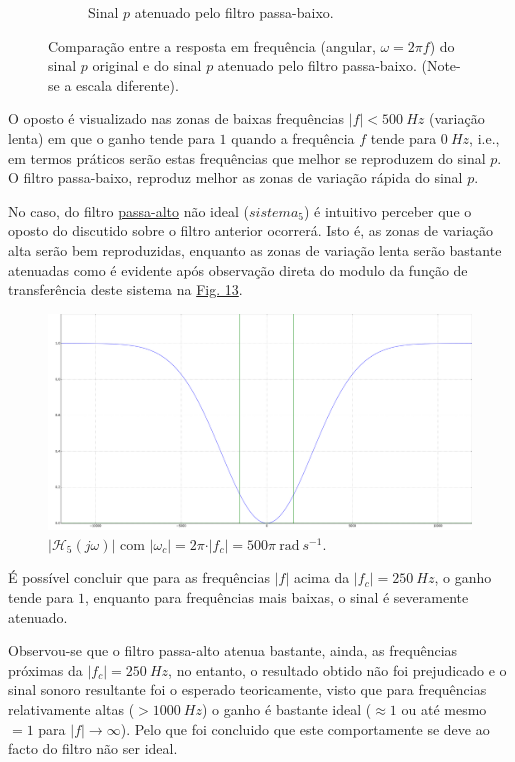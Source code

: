 \begin{figure}[ht]
\begin{subfigure}[b]{0.5\linewidth}
        \caption{Sinal \(p\) atenuado pelo filtro passa-baixo.} 
        \label{fig:p_atenuado} 
    \end{subfigure} 
    \caption{Comparação entre a resposta em frequência (angular, \(\omega = 2\pi f\)) do sinal \(p\) original e do sinal \(p\) atenuado pelo filtro passa-baixo. (Note-se a escala diferente).}
    \label{fig:multiplas_4}
\end{figure}

O oposto é visualizado nas zonas de baixas frequências \(\vert f\vert < 500\ Hz\) (variação lenta) em que o ganho tende para \(1\) quando a frequência \(f\) tende para \(0\ Hz\), i.e., em termos práticos serão estas frequências que melhor se reproduzem do sinal \(p\). O filtro passa-baixo, reproduz melhor as zonas de variação rápida do sinal \(p\).

\clearpage

No caso, do filtro \underline{passa-alto} não ideal (\(sistema_5\)) é intuitivo perceber que o oposto do discutido sobre o filtro anterior ocorrerá. Isto é, as zonas de variação alta serão bem reproduzidas, enquanto as zonas de variação lenta serão bastante atenuadas como é evidente após observação direta do modulo da função de transferência deste sistema na \hyperref[fig:ganho_passa-alto]{Fig. 13}.

\begin{figure}[H]
    \centering
    \includegraphics[width = 0.5\linewidth]{prints/ganho_passa-alto.png}   
    \caption{\(\vert \mathcal{H}_5(j\omega)\vert\) com \(\vert \omega_{c}\vert = 2\pi \cdot \vert f_{c}\vert = 500\pi\ \text{rad}\ s^{-1}\).}
    \label{fig:ganho_passa-alto}
\end{figure}

É possível concluir que para as frequências \(\vert f \vert\) acima da \(\vert f_c \vert = 250\ Hz\), o ganho tende para \(1\), enquanto para frequências mais baixas, o sinal é severamente atenuado. 

Observou-se que o filtro passa-alto atenua bastante, ainda, as frequências próximas da \(\vert f_c \vert = 250\ Hz\), no entanto, o resultado obtido não foi prejudicado e o sinal sonoro resultante foi o esperado teoricamente, visto que para frequências relativamente altas (\(> 1000\ Hz\)) o ganho é bastante ideal (\(\approx 1\) ou até mesmo \(= 1\) para \(\vert f \vert \to \infty\)). Pelo que foi concluido que este comportamente se deve ao facto do filtro não ser ideal.

